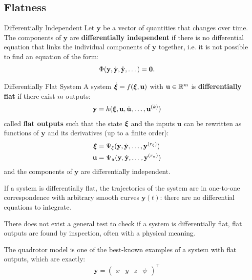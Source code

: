 \documentclass[10pt, a4paper]{report}
\newcommand{\y}{{\mathbf y}}
\begin{document}
\subsection{Flatness}\label{sec:flatness}
\begin{boxdefinition}{Differentially Independent}{}
    Let $\mathbf y$ be a vector of quantities that changes over time. The components of  $\mathbf y$ are \textbf{differentially independent} if there is no differential equation that links the individual components of $\mathbf y$ together, i.e. it is not possible to find an equation of the form:\begin{equation}
        \Phi(\mathbf y,{\dot{\mathbf y}},{\ddot{\mathbf y}},\dots)=\mathbf 0.
    \end{equation}
\end{boxdefinition}
\begin{boxdefinition}{Differentially Flat System}{}
    A system $\dot{{\boldsymbol{\xi}}}=f({\boldsymbol{\xi}},\mathbf u)$ with $\mathbf u\in{\mathbb R}^m$ is \textbf{differentially flat} if there exist $m$ outputs:\begin{equation}
        \mathbf y = h({\boldsymbol{\xi}},\mathbf u,\dot{\mathbf u},\dots,\mathbf u^{(k)})
    \end{equation}
    called \textbf{flat outputs} such that the state ${\boldsymbol{\xi}}$ and the inputs $\mathbf u$ can be rewritten as functions of $\mathbf y$ and its derivatives (up to a finite order):\begin{align}
        {\boldsymbol{\xi}}&= \Psi_\xi(\mathbf y,\dot{\mathbf y},\dots, \mathbf y^{(r_\xi)})\\
        \mathbf u&=\Psi_u(\mathbf y,\dot{\mathbf y},\dots, \mathbf y^{(r_u)})
    \end{align}
    and the components of $\mathbf y$ are differentially independent.
\end{boxdefinition}
If a system is differentially flat, the trajectories of the system are in one-to-one correspondence
with arbitrary smooth curves $\mathbf y(t)$: there are no differential equations to integrate.
\begin{boxobservation}{}{}
    There does not exist a general test to check if a system is differentially flat, flat outputs are found by inspection, often
    with a physical meaning.
\end{boxobservation}
\noindent The quadrotor model is one of the best-known examples of a system with flat outputs, which are exactly:\begin{equation}
    \y=\begin{pmatrix}
        x&y&z&\psi
    \end{pmatrix}^\top
\end{equation}
\end{document}
